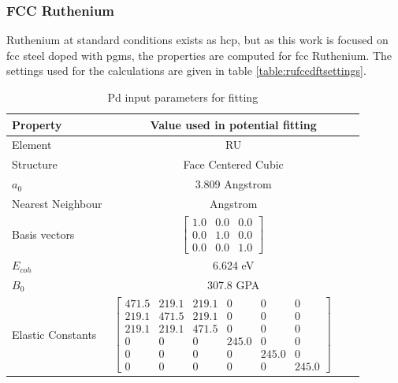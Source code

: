 \FloatBarrier
\subsubsection{FCC Ruthenium}
\label{section:fccferesults}


Ruthenium at standard conditions exists as \acrlong{hcp}, but as this work is focused on \acrshort{fcc} steel doped with \acrshort{pgm}s, the properties are computed for \acrshort{fcc} Ruthenium.  The settings used for the calculations are given in table \ref{table:rufccdftsettings}. 



\begin{table}[ht]
\renewcommand{\arraystretch}{1.2}
\begin{tabular}{lccc}
\hline\hline
Property & \multicolumn{3}{c}{Value used in potential fitting} \\
\hline\hline
Element & \multicolumn{3}{c}{RU}\\
Structure             & \multicolumn{3}{c}{Face Centered Cubic}\\
$a_0$                 & \multicolumn{3}{c}{3.809 Angstrom \cite{webelementspd}}\\
Nearest Neighbour     & \multicolumn{3}{c}{ Angstrom \cite{webelementspd}}\\
Basis vectors         & $\begin{bmatrix} 1.0 & 0.0 & 0.0 \\ 0.0 & 1.0 & 0.0 \\ 0.0 & 0.0 & 1.0  \end{bmatrix}$ \\
$E_{coh}$             & \multicolumn{3}{c}{6.624 eV \cite{semiempiricalpots}}   \\
$B_0$                 & \multicolumn{3}{c}{307.8 GPA \cite{semiempiricalpots}}   \\
Elastic Constants     & $\begin{bmatrix} 471.5 & 219.1 & 219.1 & 0 & 0 & 0 \\ 219.1 & 471.5 & 219.1 & 0 & 0 & 0 \\ 219.1 & 219.1 & 471.5 & 0 & 0 & 0 \\ 0 & 0 & 0 & 245.0 & 0 & 0 \\ 0 & 0 & 0 & 0 & 245.0 & 0 \\ 0 & 0 & 0 & 0 & 0 & 245.0 \end{bmatrix}$ \\
\hline\hline
\end{tabular}
\caption{Pd input parameters for fitting}
\label{table:ruinputparameters}
\end{table}




